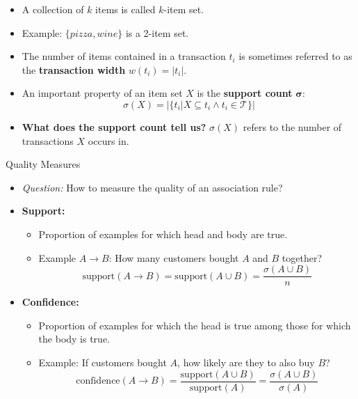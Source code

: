 \begin{frame}
	\begin{itemize}
		\item A collection of $k$ items is called $k$-item set.
		\item Example: $\{ pizza, wine \}$ is a 2-item set.
		\item The number of items contained in a transaction $t_i$ is sometimes referred to as the \textbf{transaction width} $w(t_i) = \vert t_i \vert$.
		\item An important property of an item set $X$ is the \textbf{support count} $\bm{\sigma}$:
		\begin{equation}
			\sigma(X) = \vert \{ t_i \vert X \subseteq t_i \wedge t_i \in \mathcal{T} \} \vert
		\end{equation}
		\item \textbf{What does the support count tell us?} $\sigma(X)$ refers to the number of transactions $X$ occurs in.
	\end{itemize}
\end{frame}


\begin{dwHeaderFrame}{Quality Measures}
	\begin{itemize}
		\item \textit{Question:} How to measure the quality of an association rule?
		\item \textbf{Support:}
		\begin{itemize}
			\item Proportion of examples for which head and body are true.
			\item Example $A \rightarrow B$: How many customers bought $A$ and $B$ together?
			\begin{equation}
				\text{support}(A \rightarrow B) = \text{support}(A \cup B) = \frac{\sigma(A \cup B)}{n}
			\end{equation}
		\end{itemize}
		\item \textbf{Confidence:}
		\begin{itemize}
			\item Proportion of examples for which the head is true among those for which the body is true.
			\item Example: If customers bought $A$, how likely are they to also buy $B$?
			\begin{equation}
				\text{confidence}(A \rightarrow B) = \frac{\text{support}(A \cup B)}{\text{support}(A)} = \frac{\sigma(A \cup B)}{\sigma(A)}
			\end{equation}
		\end{itemize}
	\end{itemize}
\end{dwHeaderFrame}


